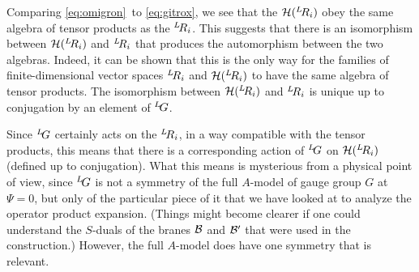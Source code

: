 Comparing \eqref{eq:omigron}\ to \eqref{eq:gitrox}, we see that the ${\cal
H}({}^L\negthinspace R_i)$ obey the same algebra of tensor
products as the $^L\negthinspace R_i$.  This suggests that there
is an isomorphism between ${\cal H}({}^L\negthinspace R_i)$ and
$^L\negthinspace R_i$ that produces the automorphism between the
two algebras. Indeed, it can be shown \cite{ref127} that this is the only way for the families of
finite-dimensional vector spaces $^L\negthinspace R_i$ and ${\cal
H}(^L\negthinspace R_i)$ to have the same algebra of tensor
products.  The isomorphism between ${\cal H}({}^L\negthinspace
R_i)$ and $^L\negthinspace R_i$ is unique up to conjugation by an
element  of $^L\negthinspace G$.

\par{}

Since $^L\negthinspace G$ certainly acts on the $^L\negthinspace
R_i$, in a way compatible with the tensor products, this means
that there is a corresponding action of $^L\negthinspace G$ on
${\cal H}({}^L\negthinspace R_i)$ (defined up to conjugation).
What this means is mysterious from a physical point of view, since
$^L\negthinspace G$ is not a symmetry of the full $A$-model of
gauge group $G$ at $\Psi=0$, but only of the particular piece of
it that we have looked at to analyze the operator product
expansion. (Things might become clearer if one could understand
the $S$-duals of the branes ${\cal B}$ and ${\cal B}'$ that were
used in the construction.) However, the full $A$-model does have
one symmetry that is relevant.

